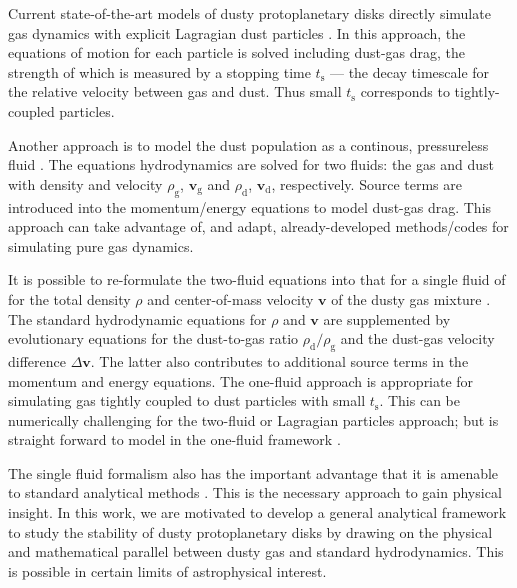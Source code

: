 \documentclass[iop, numberedappendix]{emulateapj}
\newcommand{\rhod}{\rho_\mathrm{d}}
\newcommand{\rhog}{\rho_\mathrm{g}}
\newcommand{\tstop}{t_\mathrm{s}}
\begin{document}

Current state-of-the-art models of dusty protoplanetary
disks directly simulate gas dynamics with explicit
Lagragian dust particles \citep{nelson10,bai10,johansen11,yang14,zhu14,gibbons15,simon16,baruteau16}. In this
approach, the equations of motion for each particle is solved
including dust-gas drag, the strength of which is measured 
by a stopping time $\tstop$ --- the decay timescale for the 
relative velocity between gas and dust. Thus small $\tstop$
corresponds to tightly-coupled particles. 


Another approach is to model the dust population as a continous, pressureless
fluid
\citep{paardekooper06b,meheut12,laibe12,loren14,fu14b,surville16}. The equations
hydrodynamics are solved for two fluids: the gas and dust with density and
velocity $\rhog$, $\bm{v}_\mathrm{g}$ and $\rhod$,
$\bm{v}_\mathrm{d}$, respectively. Source terms are introduced into
the momentum/energy equations to model dust-gas drag. This approach
can take advantage of, and adapt, already-developed methods/codes for
simulating pure gas dynamics. 


It is possible to re-formulate the two-fluid equations into that for a
single fluid of for the total density $\rho$ and center-of-mass
velocity $\bm{v}$ of the dusty gas mixture
\citep{laibe14}. The standard hydrodynamic equations for
$\rho$ and $\bm{v}$ are supplemented by evolutionary equations for
the dust-to-gas ratio $\rhod/\rhog$ and the dust-gas velocity
difference $\Delta\bm{v}$. The latter also contributes to
additional source terms in the momentum and energy equations.  
The one-fluid approach is appropriate for 
simulating gas tightly coupled to dust particles with small $\tstop$.  
This can be numerically challenging for the two-fluid or Lagragian
particles approach; but is straight forward to model in the
one-fluid framework \citep{price15}.  

The single fluid formalism also has the important advantage that it is
amenable to standard analytical methods
\citep{youdin05a,jacquet11}. This is the necessary  approach to gain physical insight.  
In this work, we are motivated to develop a general analytical
framework to  study the stability of dusty protoplanetary disks by
drawing on the physical and mathematical parallel between dusty gas and standard
hydrodynamics. This is possible in certain limits of astrophysical
interest.  
\end{document}
